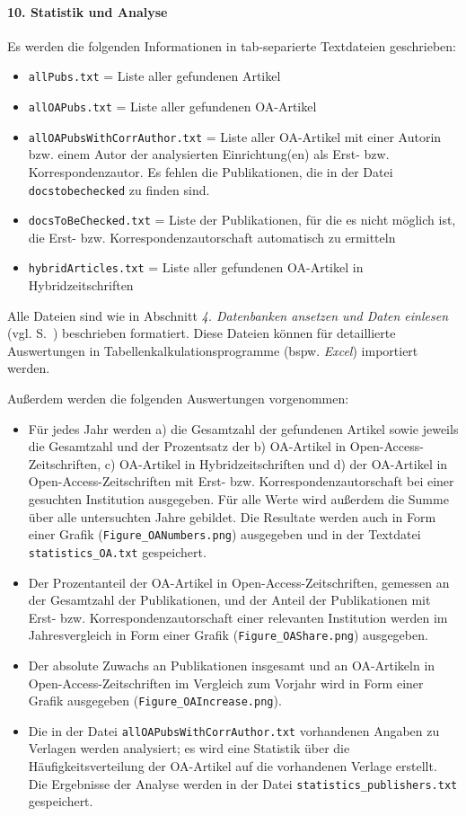 \paragraph{10. Statistik und Analyse} \label{analyse}
Es werden die folgenden Informationen in tab-separierte Textdateien geschrieben:
\begin{itemize}
\item \texttt{allPubs.txt} = Liste aller gefundenen Artikel
\item \texttt{allOAPubs.txt} = Liste aller gefundenen OA-Artikel
\item \texttt{allOAPubsWithCorrAuthor.txt} = Liste aller OA-Artikel mit einer Autorin bzw. einem Autor der analysierten Einrichtung(en) als Erst- bzw. Korrespondenzautor. Es fehlen die Publikationen, die in der Datei \texttt{docstobechecked} zu finden sind.
\item \texttt{docsToBeChecked.txt} = Liste der Publikationen, für die es nicht möglich ist, die Erst- bzw. Korrespondenzautorschaft automatisch zu ermitteln
\item \texttt{hybridArticles.txt} = Liste aller gefundenen OA-Artikel in Hybridzeitschriften
\end{itemize}
Alle Dateien sind wie in Abschnitt \textit{4. Datenbanken ansetzen und Daten einlesen} (vgl. S.~\pageref{readinput}) beschrieben formatiert. Diese Dateien können für detaillierte Auswertungen in Tabellenkalkulationsprogramme (bspw. \textit{Excel}) importiert werden.

Außerdem werden die folgenden Auswertungen vorgenommen:
\begin{itemize}
	\item Für jedes Jahr werden a) die Gesamtzahl der gefundenen Artikel sowie jeweils die  Gesamtzahl und der Prozentsatz der b) OA-Artikel in Open-Access-Zeitschriften, c) OA-Artikel in Hybridzeitschriften und d) der OA-Artikel in Open-Access-Zeit\-schriften mit Erst- bzw. Korrespondenzautorschaft bei einer gesuchten Institution ausgegeben. Für alle Werte wird außerdem die Summe über alle untersuchten Jahre gebildet. Die Resultate werden auch in Form einer Grafik (\texttt{Figure\_OANumbers.png}) ausgegeben und in der Textdatei \texttt{statistics\_OA.txt} gespeichert.
    \item Der Prozentanteil der OA-Artikel in Open-Access-Zeitschriften, gemessen an der Gesamtzahl der Publikationen, und der Anteil der Publikationen mit Erst- bzw. Korrespondenzautorschaft einer relevanten Institution werden im Jahresvergleich in Form einer Grafik (\texttt{Figure\_OAShare.png}) ausgegeben.
    \item Der absolute Zuwachs an Publikationen insgesamt und an OA-Artikeln in Open-Access-Zeitschriften im Vergleich zum Vorjahr wird in Form einer Grafik ausgegeben (\texttt{Figure\_OAIncrease.png}).
    \item Die in der Datei \texttt{allOAPubsWithCorrAuthor.txt} vorhandenen Angaben zu Verlagen werden analysiert; es wird eine Statistik über die Häufigkeitsverteilung der OA-Artikel auf die vorhandenen Verlage erstellt. Die Ergebnisse der Analyse werden in der Datei \texttt{statistics\_publishers.txt} gespeichert.
\end{itemize}


